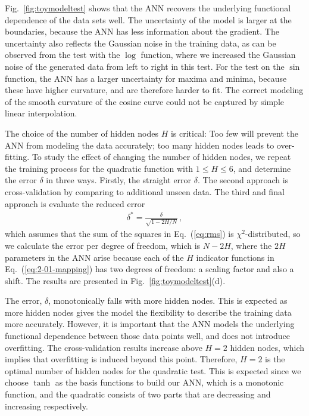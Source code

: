 \documentclass[review]{elsarticle}
\newcommand{\figref}[1]{Fig.~\ref{#1}}
\newcommand{\eqnref}[1]{Eq.~(\ref{#1})}
\newcommand{\punc}[1]{\,#1}
\newcommand{\change}[1]{#1}
\begin{document}
\figref{fig:toymodeltest} shows that the ANN recovers the underlying
functional dependence of the data sets well. The uncertainty of the model is
larger at the boundaries, because the ANN has less information about the
gradient. The uncertainty also reflects the Gaussian noise in the training
data, as can be observed from the test with the $\log$ function, where we
increased the Gaussian noise of the generated data from left to right in
this test. For the test on the $\sin$ function, the ANN has a larger
uncertainty for maxima and minima, because these have higher curvature, and
are therefore harder to fit. \change{The correct modeling of the smooth
  curvature of the cosine curve could not be captured by simple linear
  interpolation.}

The choice of the number of hidden nodes $H$ is critical: Too few will
prevent the ANN from modeling the data accurately; too many hidden nodes
leads to over-fitting. To study the effect of changing the number of hidden
nodes, we repeat the training process for the quadratic function with
$1 \leq H \leq 6$, and determine the error $\delta$ in three ways. Firstly,
the straight error $\delta$. The second approach is cross-validation by
comparing to additional unseen data\cite{Hill05}. The third and final
approach is evaluate the reduced error
%
\begin{align}
\delta^*=\frac{\delta}{\sqrt{1-2H/N}}\punc{,}\label{eq:rmsred}
\end{align}
%
which assumes that the sum of the squares in \eqnref{eq:rms} is
$\chi^2$-distributed, so we calculate the error per degree of freedom, which
is $N-2H$, where the $2H$ parameters in the ANN arise because each of the
$H$ indicator functions in \eqnref{eq:2-01-mapping} has two degrees of
freedom: a scaling factor and also a shift. The results are presented in
\figref{fig:toymodeltest}(d).

The error, $\delta$, monotonically falls with more hidden nodes. This is
expected as more hidden nodes gives the model the flexibility to describe
the training data more accurately. However, it is important that the ANN
models the underlying functional dependence between those data points well,
and does not introduce overfitting.  The cross-validation results increase
above $H=2$ hidden nodes, which implies that overfitting is induced beyond
this point. Therefore, $H=2$ is the optimal number of hidden nodes for the
quadratic test. This is expected since we choose $\tanh$ as the basis
functions to build our ANN, which is a monotonic function, and the quadratic
consists of two parts that are decreasing and increasing respectively.
\end{document}

